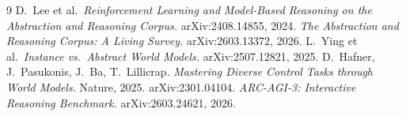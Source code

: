 \documentclass[10pt]{article}
\begin{document}
\begin{thebibliography}{9}
\small
\setlength{\itemsep}{0pt}
 D.\ Lee et al.\ \emph{Reinforcement Learning and Model-Based
Reasoning on the Abstraction and Reasoning Corpus.} arXiv:2408.14855, 2024.
 \emph{The Abstraction and Reasoning Corpus: A Living
Survey.} arXiv:2603.13372, 2026.
 L.\ Ying et al.\ \emph{Instance vs.\ Abstract World Models.}
arXiv:2507.12821, 2025.
 D.\ Hafner, J.\ Pasukonis, J.\ Ba, T.\ Lillicrap.
\emph{Mastering Diverse Control Tasks through World Models.} Nature, 2025.
arXiv:2301.04104.
 \emph{ARC-AGI-3: Interactive Reasoning Benchmark.}
arXiv:2603.24621, 2026.
\end{thebibliography}
\end{document}
